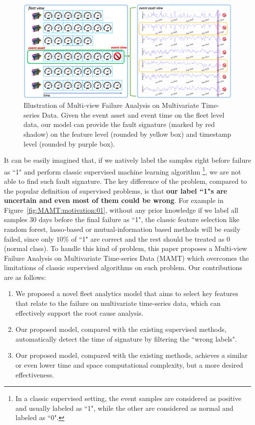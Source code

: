 \begin{figure}[tb]
\centering
\includegraphics[width=5in]{pics/multi-view_structure}
\caption{Illustration of Multi-view Failure Analysis on Multivariate Time-series Data. Given the event asset and event time on the fleet level data, our model can provide the fault signature (marked by red shadow) on the feature level (rounded by yellow box) and timestamp level (rounded by purple box). }
\label{fig:MAMT:structure}
\end{figure}

It can be easily imagined that, if we natively label the samples right before failure as ``1" and perform classic supervised machine learning algorithm \footnote{In a classic supervised setting, the event samples are considered as positive and usually labeled as ``1", while the other are considered as normal and labeled as ``0".}, we are not able to find such fault signature. The key difference of the problem, compared to the popular definition of supervised problems, is that \textbf{our label ``1"s are uncertain and even most of them could be wrong}. For example in Figure~\ref{fig:MAMT:motivation:01}, without any prior knowledge if we label all samples $30$ days before the final failure as ``1", the classic feature selection like random forest, lasso-based or mutual-information based methods will be easily failed, since only $10\%$ of ``1" are correct and the rest should be treated as $0$ (normal class). To handle this kind of problem, this paper proposes a Multi-view Failure Analysis on 
Multivariate Time-series Data (MAMT) which overcomes the limitations of classic supervised algorithms on such problem.  Our contributions are as follows:
\begin{enumerate}[(1)]
\item We proposed a novel fleet analytics model that aims to select key features that relate to the failure on multivariate time-series data, which can effectively support the root cause analysis.
\item Our proposed model, compared with the existing supervised methods, automatically detect the time of signature by filtering the ``wrong labels". 
\item Our proposed model, compared with the existing methods,
    achieves a similar or even lower time and space computational complexity, but a more desired effectiveness.
\end{enumerate}



